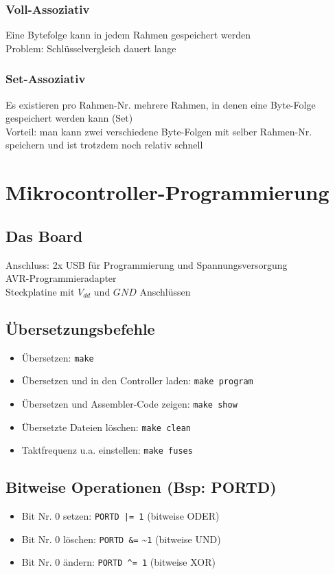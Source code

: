\documentclass[ngerman, threecolumn, 8pt]{latex4ei/latex4ei_sheet}
\begin{document}
\subsubsection{Voll-Assoziativ}
Eine Bytefolge kann in jedem Rahmen gespeichert werden \\
Problem: Schlüsselvergleich dauert lange
\subsubsection{Set-Assoziativ}
Es existieren pro Rahmen-Nr. mehrere Rahmen, in denen eine Byte-Folge gespeichert werden kann (Set) \\
Vorteil: man kann zwei verschiedene Byte-Folgen mit selber Rahmen-Nr. speichern und ist trotzdem noch relativ schnell

\section{Mikrocontroller-Programmierung}
\subsection{Das Board}
Anschluss: 2x USB für Programmierung und Spannungsversorgung \\
AVR-Programmieradapter \\
Steckplatine mit $V_{dd}$ und $GND$ Anschlüssen
\subsection{Übersetzungsbefehle}
\begin{itemize}\itemsep0pt
\item Übersetzen: \texttt{make}
\item Übersetzen und in den Controller laden: \texttt{make program}
\item Übersetzen und Assembler-Code zeigen: \texttt{make\ show}
\item Übersetzte Dateien löschen: \texttt{make clean}
\item Taktfrequenz u.a. einstellen: \texttt{make fuses}
\end{itemize}
\begin{minipage}{\columnwidth}
\subsection{Bitweise Operationen (Bsp: PORTD)}
\begin{itemize}\itemsep0pt
\item Bit Nr. 0 setzen: \texttt{PORTD |= 1} (bitweise ODER)
\item Bit Nr. 0 löschen: \texttt{PORTD \&=} \textasciitilde \texttt{1} (bitweise UND)
\item Bit Nr. 0 ändern: \texttt{PORTD \textasciicircum= 1} (bitweise XOR)
\end{itemize}
\end{minipage}
\end{document}
